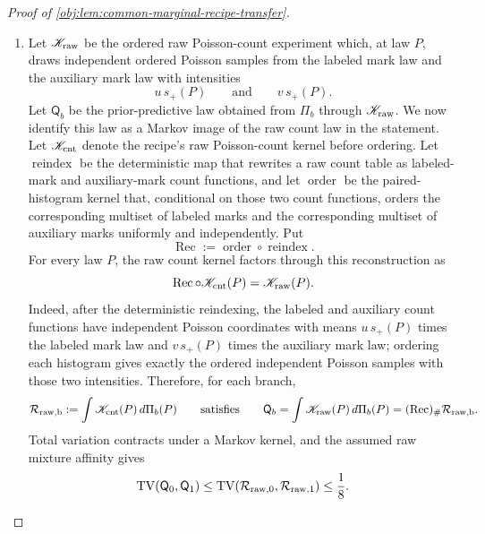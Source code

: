 \documentclass[11pt]{article}
\begin{document}
\begin{proof}[Proof of \cref{obj:lem:common-marginal-recipe-transfer}]
\begin{enumerate}
\item Let \(\mathscr K_{\rm raw}\) be the ordered raw Poisson-count experiment which, at law \(P\), draws independent ordered Poisson samples from the labeled mark law and the auxiliary mark law with intensities
\[
u\,s_+(P)
\qquad\text{and}\qquad
v\,s_+(P).
\]
Let \(\mathsf Q_b\) be the prior-predictive law obtained from \(\Pi_b\) through \(\mathscr K_{\rm raw}\).  We now identify this law as a Markov image of the raw count law in the statement.  Let \(\mathscr K_{\rm cnt}\) denote the recipe's raw Poisson-count kernel before ordering.  Let \(\operatorname{reindex}\) be the deterministic map that rewrites a raw count table as labeled-mark and auxiliary-mark count functions, and let \(\operatorname{order}\) be the paired-histogram kernel that, conditional on those two count functions, orders the corresponding multiset of labeled marks and the corresponding multiset of auxiliary marks uniformly and independently.  Put
\[
\operatorname{Rec}:=\operatorname{order}\circ\operatorname{reindex} .
\]
For every law \(P\), the raw count kernel factors through this reconstruction as
\[
\operatorname{Rec}\circ \mathscr K_{\rm cnt}(P)
=
\mathscr K_{\rm raw}(P).
\]
Indeed, after the deterministic reindexing, the labeled and auxiliary count functions have independent Poisson coordinates with means \(u\,s_+(P)\) times the labeled mark law and \(v\,s_+(P)\) times the auxiliary mark law; ordering each histogram gives exactly the ordered independent Poisson samples with those two intensities.  Therefore, for each branch,
\[
\mathcal R_{\rm raw,b}
:=\int \mathscr K_{\rm cnt}(P)\,d\Pi_b(P)
\qquad\text{satisfies}\qquad
\mathsf Q_b
=\int \mathscr K_{\rm raw}(P)\,d\Pi_b(P)
=(\operatorname{Rec})_{\#}\mathcal R_{\rm raw,b}.
\]
Total variation contracts under a Markov kernel, and the assumed raw mixture affinity gives
\[
\operatorname{TV}(\mathsf Q_0,\mathsf Q_1)
\le
\operatorname{TV}(\mathcal R_{\rm raw,0},\mathcal R_{\rm raw,1})
\le \frac18 .
\] %


\end{enumerate}
\end{proof}
\end{document}
